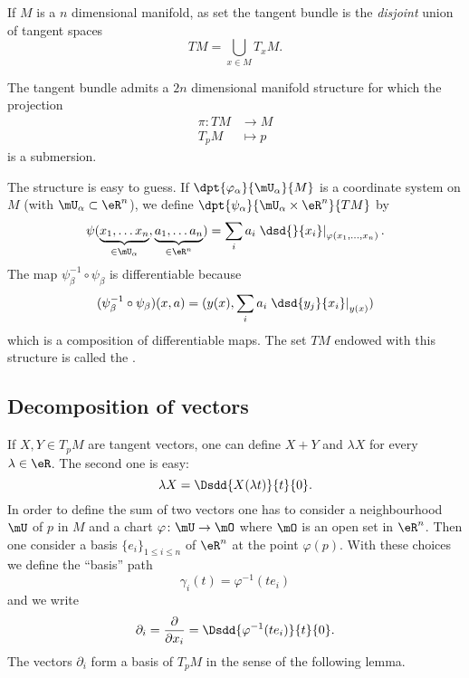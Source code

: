 If $M$ is a $n$ dimensional manifold, as set the tangent bundle is the \emph{disjoint} union of tangent spaces
\begin{equation}
  TM=\bigcup_{x\in M}T_xM.
\end{equation}

\begin{theorem}
	The tangent bundle admits a $2n$ dimensional manifold structure for which the projection
	\begin{equation}
		\begin{aligned}
			\pi \colon TM &\to M\\
			T_pM&\mapsto p
		\end{aligned}
	\end{equation}
	is a submersion.
\end{theorem}

The structure is easy to guess. If $\dpt{\varphi_{\alpha}}{\mU_{\alpha}}{M}$ is a coordinate system on $M$ (with $\mU_{\alpha}\subset\eR^n$), we define $\dpt{\psi_{\alpha}}{\mU_{\alpha}\times \eR^n}{TM}$ by
\[
  \psi( \underbrace{x_1,\ldots x_n}_{\in\mU_{\alpha}},\underbrace{a_1,\ldots a_n}_{\in\eR^n}  )
          =\sum_i a_i\left.\dsd{}{x_i}\right|_{\varphi(x_1,\ldots,x_n)}.
\]
The map $\psi_{\beta}^{-1}\circ\psi_{\beta}$ is differentiable because
\[
(\psi_{\beta}^{-1}\circ\psi_{\beta})(x,a)=( y(x),\sum_i a_i\left.\dsd{y_j}{x_i}\right|_{y(x)}  )
\]
which is a composition of differentiable maps. The set $TM$ endowed with this structure is called the .


\subsection{Decomposition of vectors}

If \( X,Y\in T_pM\) are tangent vectors, one can define \( X+Y\) and \( \lambda X\) for every \( \lambda\in\eR\). The second one is easy:
\begin{equation}
    \lambda X=\Dsdd{ X(\lambda t) }{t}{0}.
\end{equation}
In order to define the sum of two vectors one has to consider a neighbourhood \( \mU\) of \( p\) in \( M\) and a chart \( \varphi\colon \mU\to \mO\) where \( \mO\) is an open set in \( \eR^n\). Then one consider a basis \( \{ e_i \}_{1\leq i\leq n}\) of \( \eR^n\) at the point \( \varphi(p)\). With these choices we define the ``basis'' path
\begin{equation}
    \gamma_i(t)=\varphi^{-1}(te_i)
\end{equation}
and we write
\begin{equation}
    \partial_i=\frac{ \partial  }{ \partial x_i }=\Dsdd{ \varphi^{-1}(te_i) }{t}{0}.
\end{equation}
The vectors \( \partial_i\) form a basis of \( T_pM\) in the sense of the following lemma.

